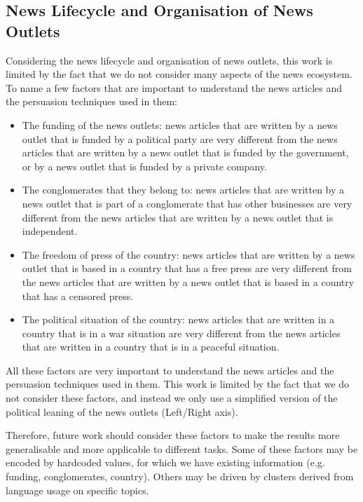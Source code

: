 
\subsection{News Lifecycle and Organisation of News Outlets}
Considering the news lifecycle and organisation of news outlets, this work is limited by the fact that we do not consider many aspects of the news ecosystem.
To name a few factors that are important to understand the news articles and the persuasion techniques used in them:
\begin{itemize}
    \item The funding of the news outlets: news articles that are written by a news outlet that is funded by a political party are very different from the news articles that are written by a news outlet that is funded by the government, or by a news outlet that is funded by a private company.
    \item The conglomerates that they belong to: news articles that are written by a news outlet that is part of a conglomerate that has other businesses are very different from the news articles that are written by a news outlet that is independent.
    \item The freedom of press of the country: news articles that are written by a news outlet that is based in a country that has a free press are very different from the news articles that are written by a news outlet that is based in a country that has a censored press.
    \item The political situation of the country: news articles that are written in a country that is in a war situation are very different from the news articles that are written in a country that is in a peaceful situation.
\end{itemize}

All these factors are very important to understand the news articles and the persuasion techniques used in them. This work is limited by the fact that we do not consider these factors, and instead we only use a simplified version of the political leaning of the news outlets (Left/Right axis).

Therefore, future work should consider these factors to make the results more generalisable and more applicable to different tasks.
Some of these factors may be encoded by hardcoded values, for which we have existing information (e.g. funding, conglomerates, country).
Others may be driven by clusters derived from language usage on specific topics.

